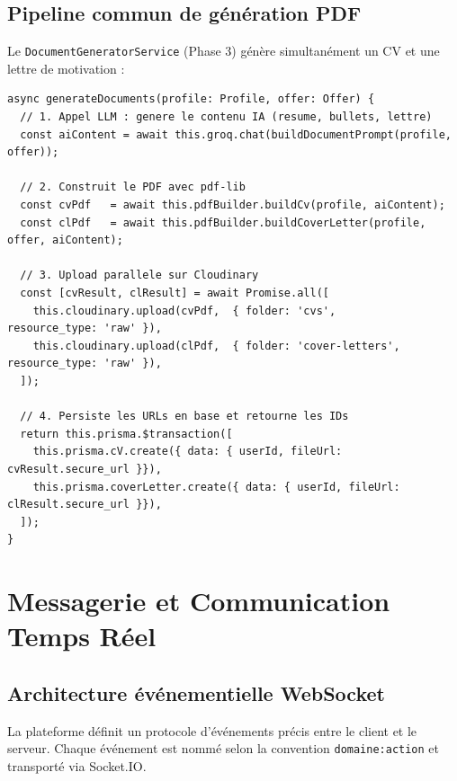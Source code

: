 ﻿\documentclass[12pt,a4paper]{report}
\begin{document}
\subsection{Pipeline commun de génération PDF}

Le \texttt{DocumentGeneratorService} (Phase 3) génère simultanément un CV et une lettre de motivation :

\begin{lstlisting}[style=ts, caption={Pipeline de génération PDF avec pdf-lib et Cloudinary}]
async generateDocuments(profile: Profile, offer: Offer) {
  // 1. Appel LLM : genere le contenu IA (resume, bullets, lettre)
  const aiContent = await this.groq.chat(buildDocumentPrompt(profile, offer));

  // 2. Construit le PDF avec pdf-lib
  const cvPdf   = await this.pdfBuilder.buildCv(profile, aiContent);
  const clPdf   = await this.pdfBuilder.buildCoverLetter(profile, offer, aiContent);

  // 3. Upload parallele sur Cloudinary
  const [cvResult, clResult] = await Promise.all([
    this.cloudinary.upload(cvPdf,  { folder: 'cvs',           resource_type: 'raw' }),
    this.cloudinary.upload(clPdf,  { folder: 'cover-letters', resource_type: 'raw' }),
  ]);

  // 4. Persiste les URLs en base et retourne les IDs
  return this.prisma.$transaction([
    this.prisma.cV.create({ data: { userId, fileUrl: cvResult.secure_url }}),
    this.prisma.coverLetter.create({ data: { userId, fileUrl: clResult.secure_url }}),
  ]);
}
\end{lstlisting}

\section{Messagerie et Communication Temps Réel}

\subsection{Architecture événementielle WebSocket}

La plateforme définit un protocole d'événements précis entre le client et le serveur. Chaque événement est nommé selon la convention \texttt{domaine:action} et transporté via Socket.IO.
\end{document}
